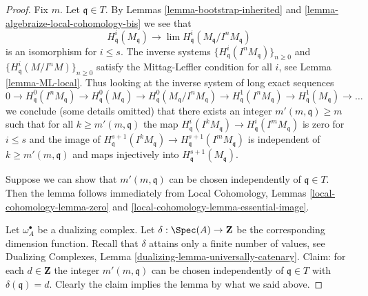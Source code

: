 \begin{proof}
Fix $m$. Let $\mathfrak q \in T$.
By Lemmas \ref{lemma-bootstrap-inherited} and
\ref{lemma-algebraize-local-cohomology-bis}
we see that
$$
H^i_\mathfrak q(M_\mathfrak q)
\longrightarrow
\lim H^i_\mathfrak q(M_\mathfrak q/I^nM_\mathfrak q)
$$
is an isomorphism for $i \leq s$. The inverse systems
$\{H^i_\mathfrak q(I^nM_\mathfrak q)\}_{n \geq 0}$ and
$\{H^i_\mathfrak q(M/I^nM)\}_{n \geq 0}$
satisfy the Mittag-Leffler condition for all $i$, see
Lemma \ref{lemma-ML-local}. Thus looking at the inverse system of
long exact sequences
$$
0 \to H^0_\mathfrak q(I^nM_\mathfrak q) \to
H^0_\mathfrak q(M_\mathfrak q) \to
H^0_\mathfrak q(M_\mathfrak q/I^nM_\mathfrak q) \to
H^1_\mathfrak q(I^nM_\mathfrak q) \to
H^1_\mathfrak q(M_\mathfrak q) \to \ldots
$$
we conclude (some details omitted) that there exists an integer
$m'(m, \mathfrak q) \geq m$ such that for all $k \geq m'(m, \mathfrak q)$
the map
$H^i_\mathfrak q(I^kM_\mathfrak q) \to H^i_\mathfrak q(I^mM_\mathfrak q)$
is zero for $i \leq s$ and the image of
$H^{s + 1}_\mathfrak q(I^kM_\mathfrak q) \to
H^{s + 1}_\mathfrak q(I^mM_\mathfrak q)$
is independent of $k \geq m'(m, \mathfrak q)$ and
maps injectively into $H^{s + 1}_\mathfrak q(M_\mathfrak q)$.

\medskip\noindent
Suppose we can show that $m'(m, \mathfrak q)$ can be chosen
independently of $\mathfrak q \in T$.
Then the lemma follows immediately from
Local Cohomology, Lemmas \ref{local-cohomology-lemma-zero} and
\ref{local-cohomology-lemma-essential-image}.

\medskip\noindent
Let $\omega_A^\bullet$ be a dualizing complex. Let
$\delta : \Spec(A) \to \mathbf{Z}$ be the corresponding
dimension function. Recall that $\delta$ attains only a
finite number of values, see
Dualizing Complexes, Lemma \ref{dualizing-lemma-universally-catenary}.
Claim: for each $d \in \mathbf{Z}$ the integer
$m'(m, \mathfrak q)$ can be chosen independently
of $\mathfrak q \in T$ with $\delta(\mathfrak q) = d$.
Clearly the claim implies the lemma by what we said above.


\end{proof}
